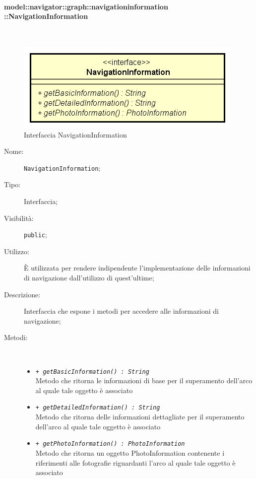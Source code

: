 \documentclass[../DefinizioneDiProdotto.tex]{subfiles}
\begin{document}
\paragraph{model::navigator::graph::navigationinformation \\ ::NavigationInformation}
\
\begin{figure}[H]
	\centering
	\includegraphics[width=\maxwidth]{img/NavigationInformation.png}
	\caption{Interfaccia NavigationInformation}\label{fig:model::navigator::graph::navigationinformation::NavigationInformation} 
\end{figure}
\begin{description}
	\item[Nome:] \texttt{NavigationInformation};
	\item[Tipo:] Interfaccia;
	\item[Visibilità:] \texttt{public};
	\item[Utilizzo:] È utilizzata per rendere indipendente l'implementazione delle informazioni di navigazione dall'utilizzo di quest'ultime;
	\item[Descrizione:] Interfaccia che espone i metodi per accedere alle informazioni di navigazione;
	\item[Metodi:] \
	\begin{itemize}
		\item \texttt{+ \textit{getBasicInformation() : String}}\\
		Metodo che ritorna le informazioni di base per il superamento dell'arco al quale tale oggetto è associato
		\item \texttt{+ \textit{getDetailedInformation() : String}}\\
		Metodo che ritorna delle informazioni dettagliate per il superamento dell'arco al quale tale oggetto è associato
		\item \texttt{+ \textit{getPhotoInformation() : PhotoInformation}}\\
		Metodo che ritorna un oggetto PhotoInformation contenente i riferimenti alle fotografie riguardanti l'arco al quale tale oggetto è associato
	\end{itemize}
\end{description}
\end{document}

